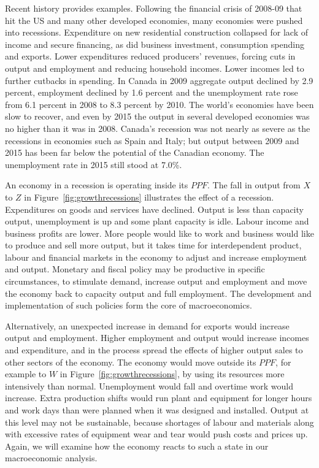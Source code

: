 Recent history provides examples. Following the financial crisis of 2008-09
that hit the US and many other developed economies, many economies were
pushed into recessions. Expenditure on new residential construction
collapsed for lack of income and secure financing, as did business
investment, consumption spending and exports. Lower expenditures reduced
producers' revenues, forcing cuts in output and employment and reducing
household incomes. Lower incomes led to further cutbacks in spending. In
Canada in 2009 aggregate output declined by 2.9 percent, employment declined
by 1.6 percent and the unemployment rate rose from 6.1 percent in 2008 to
8.3 percent by 2010. The world's economies have been slow to recover, and
even by 2015 the output in several developed economies was no higher than it
was in 2008. Canada's recession was not nearly as severe as the recessions
in economies such as Spain and Italy; but output between 2009 and 2015 has
been far below the potential of the Canadian economy. The unemployment rate
in 2015 still stood at 7.0\%.

\newhtmlpage



An economy in a recession is operating inside its $PPF$. The fall in output
from $X$ to $Z$ in Figure~\ref{fig:growthrecessions} illustrates the effect
of a recession. Expenditures on goods and services have declined. Output is
less than capacity output, unemployment is up and some plant capacity is
idle. Labour income and business profits are lower. More people would like
to work and business would like to produce and sell more output, but it
takes time for interdependent product, labour and financial markets in the
economy to adjust and increase employment and output. Monetary and fiscal
policy may be productive in specific circumstances, to stimulate demand,
increase output and employment and move the economy back to capacity output
and full employment. The development and implementation of such policies
form the core of macroeconomics.

\newhtmlpage

Alternatively, an unexpected increase in demand for exports would increase
output and employment. Higher employment and output would increase incomes
and expenditure, and in the process spread the effects of higher output
sales to other sectors of the economy. The economy would move outside its $%
PPF$, for example to $W$ in Figure~\ref{fig:growthrecessions}, by using its
resources more intensively than normal. Unemployment would fall and overtime
work would increase. Extra production shifts would run plant and equipment
for longer hours and work days than were planned when it was designed and
installed. Output at this level may not be sustainable, because shortages of
labour and materials along with excessive rates of equipment wear and tear
would push costs and prices up. Again, we will examine how the economy
reacts to such a state in our macroeconomic analysis.


